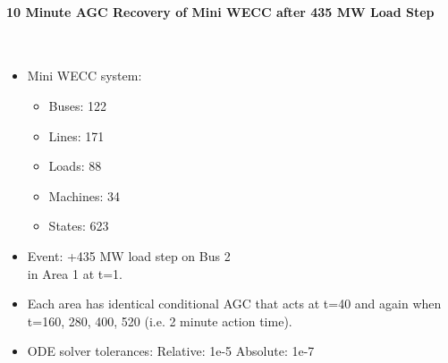 \documentclass[12pt]{article}
\begin{document}
\onehalfspacing
\paragraph{10 Minute AGC Recovery of Mini WECC after 435 MW Load Step} \ \\

\begin{minipage}{0.47\linewidth}
\begin{itemize}
\item Mini WECC system:
\begin{itemize}
 em
\small
\item Buses: 122
\item Lines: 171
\item Loads: 88
\item Machines: 34
\item States: 623
\end{itemize}
\item Event: +435 MW load step on Bus 2\\in Area 1 at t=1.

\item Each area has identical conditional AGC that acts at t=40 and again when t=160, 280, 400, 520 (i.e. 2 minute action time).

\item ODE solver tolerances:
\subitem Relative: 1e-5
\subitem Absolute: 1e-7

\end{itemize}
\vfill
\end{minipage}\hspace{2em}%
\end{document}
